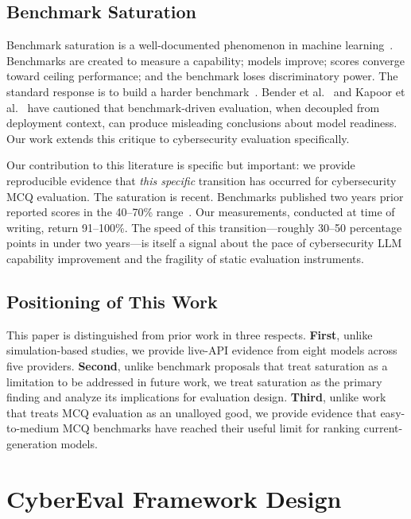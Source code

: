 \documentclass[final]{elsarticle}
\begin{document}
\subsection{Benchmark Saturation}

Benchmark saturation is a well-documented phenomenon in machine learning~\cite{ott2022fairness,kiela2021dynabench,raji2021ai}. Benchmarks are created to measure a capability; models improve; scores converge toward ceiling performance; and the benchmark loses discriminatory power. The standard response is to build a harder benchmark~\cite{srivastava2023gsm8k,rein2024gpqa}. Bender et al.~\cite{bender2021dangers} and Kapoor et al.~\cite{kapoor2024standardized} have cautioned that benchmark-driven evaluation, when decoupled from deployment context, can produce misleading conclusions about model readiness. Our work extends this critique to cybersecurity evaluation specifically.

Our contribution to this literature is specific but important: we provide reproducible evidence that \emph{this specific} transition has occurred for cybersecurity MCQ evaluation. The saturation is recent. Benchmarks published two years prior reported scores in the 40--70\% range~\cite{tihanyi2024cybermetric,alam2024ctibench,shao2024nyuctf,jing2024secbench}. Our measurements, conducted at time of writing, return 91--100\%. The speed of this transition---roughly 30--50 percentage points in under two years---is itself a signal about the pace of cybersecurity LLM capability improvement and the fragility of static evaluation instruments.

\subsection{Positioning of This Work}

This paper is distinguished from prior work in three respects. \textbf{First}, unlike simulation-based studies, we provide live-API evidence from eight models across five providers. \textbf{Second}, unlike benchmark proposals that treat saturation as a limitation to be addressed in future work, we treat saturation as the primary finding and analyze its implications for evaluation design. \textbf{Third}, unlike work that treats MCQ evaluation as an unalloyed good, we provide evidence that easy-to-medium MCQ benchmarks have reached their useful limit for ranking current-generation models.

\section{CyberEval Framework Design}
\end{document}
